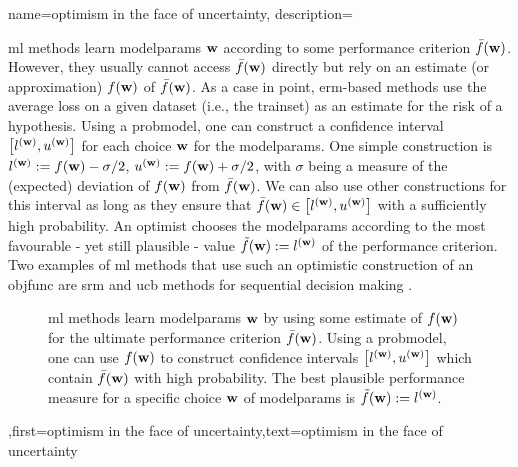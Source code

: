 {name={optimism in the face of uncertainty},
	description={\gls{ml} methods learn \gls{modelparams} ${\bf w}$ 
		according to some performance criterion $\bar{f}({\bf w})$. However, they usually 
		cannot access $\bar{f}({\bf w})$ directly but rely on an estimate (or approximation) 
		$f({\bf w})$ of $\bar{f}({\bf w})$. As a case in point, \gls{erm}-based methods use 
		the average \gls{loss} on a given \gls{dataset} (i.e., the \gls{trainset}) as an estimate 
		for the \gls{risk} of a \gls{hypothesis}. Using a \gls{probmodel}, one can construct 
		a confidence interval 
	$\big[ l^{({\bf w})},  u^{({\bf w})} \big]$ for each choice ${\bf w}$ for the \gls{modelparams}.
	    One simple construction is $l^{({\bf w})} := f({\bf w}) - \sigma/2$, $u^{({\bf w})} := f({\bf w})+ \sigma/2$, 
	    with $\sigma$ being a measure of the (expected) deviation of $f({\bf w})$ from $\bar{f}({\bf w})$. 
	We can also use other constructions for this interval as long as they ensure that $\bar{f}({\bf w}) \in\big[ l^{({\bf w})},  u^{({\bf w})} \big]$ 
	with a sufficiently high probability. An optimist chooses the \gls{modelparams} 
	according to the most favourable - yet still plausible - value $\tilde{f}({\bf w}) :=  l^{({\bf w})}$ 
	of the performance criterion. Two examples of \gls{ml} methods that use such an optimistic 
	construction of an \gls{objfunc} are \gls{srm} \cite[Ch. 11]{ShalevMLBook} and \gls{ucb} methods 
	for sequential decision making \cite[Sec. 2.2]{Bubeck2012}. 
		\begin{figure}[H]
				\begin{center}
\caption{\gls{ml} methods learn \gls{modelparams} ${\bf w}$ by using some estimate of $f({\bf w})$ for 
	the ultimate performance criterion $\bar{f}({\bf w})$. Using a \gls{probmodel}, one can use $f({\bf w})$ to 
	construct confidence intervals $\big[ l^{({\bf w})},  u^{({\bf w})} \big]$ which contain $\bar{f}({\bf w})$  
	with high probability. The best plausible performance measure for a specific choice ${\bf w}$ of \gls{modelparams} 
	is $\tilde{f}({\bf w}) := l^{({\bf w})}$.} 
	\end{center}
		\end{figure}},first={optimism in the face of uncertainty},text={optimism in the face of uncertainty} 
}

